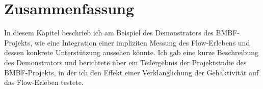 \section{Zusammenfassung}
In diesem Kapitel beschrieb ich am Beispiel des Demonstrators des \acs{BMBF}-Projekts, wie eine Integration einer impliziten Messung des Flow-Erlebens und dessen konkrete Unterstützung aussehen könnte. Ich gab eine kurze Beschreibung des Demonstrators und berichtete über ein Teilergebnis der Projektstudie des \acs{BMBF}-Projekts, in der ich den Effekt einer Verklanglichung der Gehaktivität auf das Flow-Erleben testete.